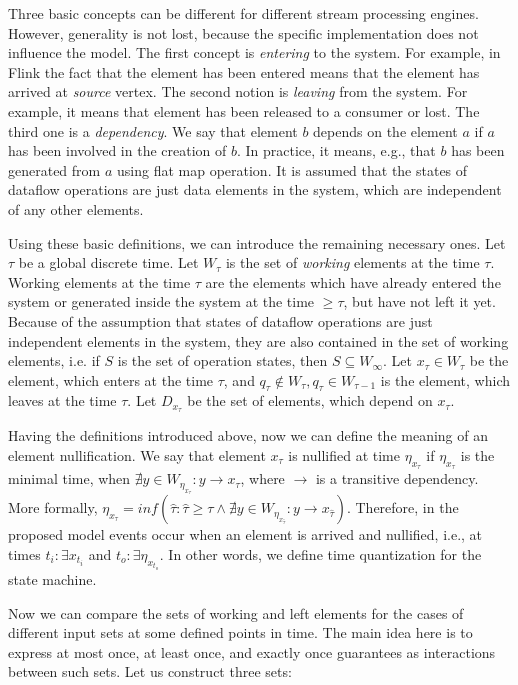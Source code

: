 \documentclass[sigconf]{acmart}
\theoremstyle{remark}
\begin{document}
Three basic concepts can be different for different stream processing engines. However, generality is not lost, because the specific implementation does not influence the model. The first concept is {\em entering} to the system. For example, in Flink the fact that the element has been entered means that the element has arrived at {\em source} vertex. The second notion is {\em leaving} from the system. For example, it means that element has been released to a consumer or lost. The third one is a {\em dependency}. We say that element $b$ depends on the element $a$ if $a$ has been involved in the creation of $b$. In practice, it means, e.g., that $b$ has been generated from $a$ using flat map operation. It is assumed that the states of dataflow operations are just data elements in the system, which are independent of any other elements.

Using these basic definitions, we can introduce the remaining necessary ones. Let $\tau$ be a global discrete time. Let $W_\tau$ is the set of {\em working} elements at the time $\tau$. Working elements at the time $\tau$ are the elements which have already entered the system or generated inside the system at the time $\geqslant{\tau}$, but have not left it yet. Because of the assumption that states of dataflow operations are just independent elements in the system, they are also contained in the set of working elements, i.e. if $S$ is the set of operation states, then $S\subseteq{W_\infty}$. Let $x_\tau\in{W_\tau}$ be the element, which enters at the time $\tau$, and $q_\tau\notin{W_\tau},q_\tau\in{W_{\tau-1}}$ is the element, which leaves at the time $\tau$. Let $D_{x_{\tau}}$ be the set of elements, which depend on $x_\tau$.

Having the definitions introduced above, now we can define the meaning of an element nullification. We say that element $x_\tau$ is nullified at time $\eta_{x_{\tau}}$ if $\eta_{x_{\tau}}$ is the minimal time, when $\nexists{y\in{W_{\eta_{x_{\tau}}}}}:{y}\to{x_{\tau}}$, where $\to$ is a transitive dependency. More formally, $\eta_{x_{\tau}} = inf(\hat{\tau}:\hat{\tau}\geqslant{\tau}\land{\nexists{y\in{W_{\eta_{x_{\hat{\tau}}}}}}:{y}\to{x_{\hat{\tau}}}})$. Therefore, in the proposed model events occur when an element is arrived and nullified, i.e., at times $t_i:\exists{x_{t_i}}$ and $t_o:\exists{\eta_{x_{t_o}}}$. In other words, we define time quantization for the state machine.

Now we can compare the sets of working and left elements for the cases of different input sets at some defined points in time. The main idea here is to express at most once, at least once, and exactly once guarantees as interactions between such sets. Let us construct three sets:
\end{document}
